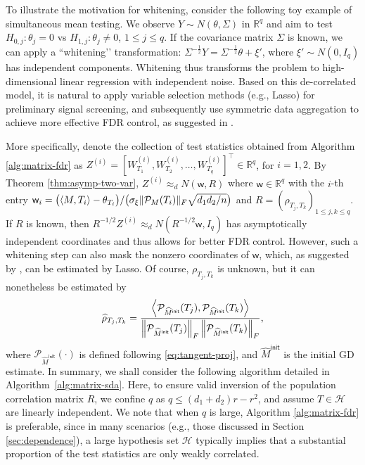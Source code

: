 \documentclass[12pt]{article}
\newcommand{\tF}{{\rm F}}
\newcommand{\norm}[1]{\left\lVert#1\right\rVert}
\newcommand{\R}{\mathbb{R}}
\newcommand{\cH}{\mathcal{H}}
\newcommand{\cP}{\mathcal{P}}
\def\sfw{\mathsf{w}}
\def\calP{{\mathcal P}}
\def\RR{{\mathbb R}}
\theoremstyle{plain}
\begin{document}
\begin{sloppypar}
To illustrate the motivation for whitening, consider the following toy example of simultaneous mean testing. We observe $Y\sim N(\theta,\Sigma)$ in $\R^q$ and aim to test $H_{0,j}:\theta_j=0$ vs $H_{1,j}:\theta_j \neq 0$, $1\le j\le q$. If the covariance matrix $\Sigma$ is known, we can apply a ``whitening’’ transformation: $\Sigma^{-\frac{1}{2}}Y =\Sigma^{-\frac{1}{2}}\theta + \xi'$, where $\xi'\sim N(0,I_q)$ has independent components. Whitening thus transforms the problem to high-dimensional linear regression with independent noise. Based on this de-correlated model, it is natural to apply variable selection methods (e.g., Lasso) for preliminary signal screening, and subsequently use symmetric data aggregation to achieve more effective FDR control, as suggested in \cite{du2021false}.


More specifically, denote the collection of test statistics obtained from Algorithm \ref{alg:matrix-fdr} as $ Z^{(i)}=\left[W^{(i)}_{T_1},  W^{(i)}_{T_2}, \dots, W^{(i)}_{T_q} \right]^\top\in\RR^q$, for $i=1, 2$. By Theorem \ref{thm:asymp-two-var}, $Z^{(i)}{\approx}_d N(\sfw, R)$ where $\textsf{w}\in\RR^{q}$ with the $i$-th entry $\sfw_i=\big(\langle M, T_i\rangle-\theta_{T_i}\big)/\big(\sigma_{\xi}\|\calP_M(T_i)\|_{\rm F}\sqrt{d_1d_2/n}\big)$ and $R=(\rho_{T_j,T_k})_{1\le j,k\le q}$. If $R$ is known, then $R^{-1/2}Z^{(i)}\approx_d N(R^{-1/2} \sfw, I_q)$ has asymptotically independent coordinates and thus allows for better FDR control. However, such a whitening step can also mask the nonzero coordinates of $\sfw$, which, as suggested by \cite{du2021false}, can be estimated by Lasso. Of course, $\rho_{T_j,T_k}$ is unknown, but it can nonetheless be estimated by
$$
\widehat{\rho}_{T_j,T_k} = \frac{\left\langle \cP_{ \widehat{M}^{\mathsf{init}} } (T_j) ,\cP_{ \widehat{M}^{\mathsf{init}} }(T_k)  \right\rangle }{ \norm{\cP_{ \widehat{M}^{\mathsf{init}} }(T_j)}_{\tF}\norm{\cP_{ \widehat{M}^{\mathsf{init}} }(T_k)}_{\tF} },
$$
where $\cP_{ \widehat{M}^{\mathsf{init}} }(\cdot)$ is defined following \eqref{eq:tangent-proj}, and $\widehat{M}^{\mathsf{init}} $ is the initial GD estimate. In summary, we shall consider the following algorithm detailed in Algorithm~\ref{alg:matrix-sda}. Here, to ensure valid inversion of the population correlation matrix $R$, we confine $q$ as $q\le (d_1+d_2)r-r^2$, and assume $T\in\cH$ are linearly independent. We note that when $q$ is large, Algorithm \ref{alg:matrix-fdr} is preferable, since in many scenarios (e.g., those discussed in Section \ref{sec:dependence}), a large hypothesis set $\cH$ typically implies that a substantial proportion of the test statistics are only weakly correlated.


\end{sloppypar}
\end{document}

